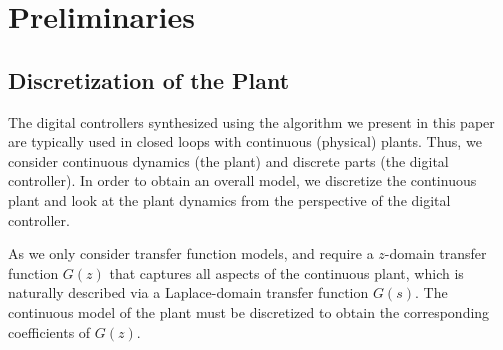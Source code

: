 \documentclass[final]{sig-alternate-05-2015}
\begin{document}


\section{Preliminaries}\label{sec:preliminaries}

\subsection{Discretization of the Plant}
\label{ssec:SandH}

The digital controllers synthesized using the algorithm we present in this
paper are typically used in closed loops with continuous (physical) plants. 
Thus, we consider continuous dynamics (the plant) and discrete parts (the
digital controller). In order to obtain an overall model, we discretize the
continuous plant and look at the plant dynamics from the perspective of the digital controller. 

As we only consider transfer function models, and require a $z$-domain transfer
function $G(z)$ that captures all aspects of the continuous plant, 
which is naturally described via a Laplace-domain transfer function $G(s)$. 
The continuous model of the plant must be discretized to obtain the
corresponding coefficients of $G(z)$.
\end{document}

